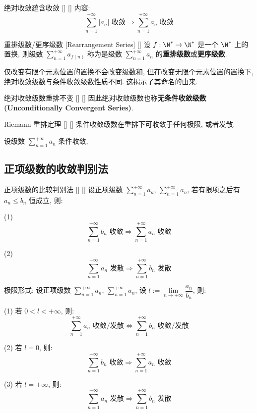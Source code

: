 \documentclass[UTF8]{ctexart}
\begin{document}
            \begin{ppt}
			    []
			    {绝对收敛蕴含收敛}
			    []
			    []
                内容: 
                \[\sum\limits_{n=1}^{+\infty}|a_n|\text{ 收敛}
                \Longrightarrow
                \sum\limits_{n=1}^{+\infty}a_n\text{ 收敛}\]
                \end{ppt}
			
			\begin{dfn}
			    []
			    {重排级数/更序级数 }
			    [Rearrangement Series]
			    []
				设 \(f:\N^*\to\N^*\) 是一个 \(\N^*\) 上的置换, 则级数 \(\sum\limits_{n=1}^{+\infty}a_{f(n)}\) 称为是级数 \(\sum\limits_{n=1}^{+\infty}a_n\) 的\textbf{重排级数}或\textbf{更序级数}. 

				仅改变有限个元素位置的置换不会改变级数和, 但在改变无限个元素位置的置换下, 绝对收敛级数与条件收敛级数性质不同. 这揭示了其命名的由来. 
			\end{dfn}

			\begin{thm}
			    []
			    {绝对收敛级数重排不变}
			    []
			    []
				因此绝对收敛级数也称\textbf{无条件收敛级数 (Unconditionally Convergent Series)}. 
			\end{thm}
			
			\begin{thm}
			    []
			    {Riemann 重排定理}
			    []
			    []
				条件收敛级数在重排下可收敛于任何极限, 或者发散. 

				设级数 \(\sum\limits_{n=1}^{+\infty}a_n\) 条件收敛, 
			\end{thm}

		\subsection{正项级数的收敛判别法}
			
			\begin{thm}
			    []
			    {正项级数的比较判别法}
			    []
			    []
				设正项级数 \(\sum\limits_{n=1}^{+\infty}a_n\), \(\sum\limits_{n=1}^{+\infty}a_n\), 若有限项之后有 \(a_n\leq b_n\) 恒成立, 则: 

				(1)
				\[\sum\limits_{n=1}^{+\infty}b_n\text{ 收敛}\Longrightarrow\sum\limits_{n=1}^{+\infty}a_n\text{ 收敛}\]

				(2)
				\[\sum\limits_{n=1}^{+\infty}a_n\text{ 发散}\Longrightarrow\sum\limits_{n=1}^{+\infty}b_n\text{ 发散}\]

			    {}
			    {极限形式: }
			    {}
			    {}
				设正项级数 \(\sum\limits_{n=1}^{+\infty}a_n\), \(\sum\limits_{n=1}^{+\infty}a_n\), 设 \(l:=\lim\limits_{n\to+\infty}\dfrac{a_n}{b_n}\), 则: 

				(1) 若 \(0<l<+\infty\), 则: 
				\[\sum\limits_{n=1}^{+\infty}a_n\text{ 收敛/发散}\iff\sum\limits_{n=1}^{+\infty}b_n\text{ 收敛/发散}\]

				(2) 若 \(l=0\), 则: 
				\[\sum\limits_{n=1}^{+\infty}b_n\text{ 收敛}\Longrightarrow\sum\limits_{n=1}^{+\infty}a_n\text{ 收敛}\]

				(3) 若 \(l=+\infty\), 则: 
				\[\sum\limits_{n=1}^{+\infty}a_n\text{ 发散}\Longrightarrow\sum\limits_{n=1}^{+\infty}b_n\text{ 发散}\]
			\end{thm}
\end{document}
